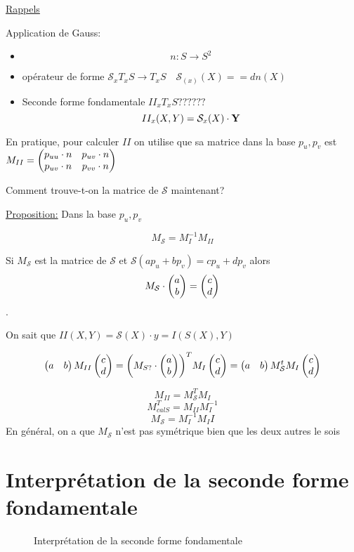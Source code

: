 



\underline{Rappels} 

Application de Gauss: 

\begin{itemize}
	\item $$n: S \to S^2$$ 
	\item opérateur de forme $\mathcal{S}_x T_{x} S \to T_{x} S\quad \mathcal{S}_(x)(X) = =dn(X)$ 
	\item Seconde forme fondamentale $II_{x} T_{x} S??????$ $$II_{x} (X,Y) = \mathcal{S}_x(X)\cdot \vb{Y}$$ 
\end{itemize}

En pratique, pour calculer $II$ on utilise que sa matrice dans la base $p_{u},p_{v} $ est $M_{II} = \begin{pmatrix} p_{uu} \cdot n & p_{uv} \cdot n \\ p_{uv} \cdot n & p_{vv} \cdot n \end{pmatrix}$ 

Comment trouve-t-on la matrice de $\mathcal{S} $ maintenant?

\underline{Proposition:} Dans la base $p_{u},p_v$  

$$M_{\mathcal{S}} = M_{I}^{-1} M_{II} $$ 

Si $M_{\mathcal{S}}$ est la matrice de $\mathcal{S} $ et $\mathcal{S}(ap_{u} + bp_{v}) = cp_{u} + dp_{v}$ alors $$M_{\mathcal{S} } \cdot \begin{pmatrix} a\\b \end{pmatrix} = \begin{pmatrix} c\\d \end{pmatrix}$$.



On sait que $II(X,Y) = \mathcal{S}(X) \cdot y = I(S(X), Y)$ 

$$\begin{pmatrix} a&b \end{pmatrix} M_{II} \begin{pmatrix} c\\d \end{pmatrix} = \qty(M_{S?} \cdot \begin{pmatrix} a\\b \end{pmatrix})^T M_{I} \begin{pmatrix} c\\d \end{pmatrix} = \begin{pmatrix} a&b \end{pmatrix} M_{\mathcal{S} }^tM_{I} \begin{pmatrix} c\\d \end{pmatrix}$$ 

$$M_{II} = M_{\mathcal{S} }^T M_{I}  $$ 
$$M_{cal S}^T=M_{II} M_{I}^{-1} $$ 
$$M_{\mathcal{S} } = M_{I}^{-1} M_II $$ 
En général, on a que $M_{\mathcal{S} } $ n'est pas symétrique bien que les deux autres le sois 


\section*{Interprétation de la seconde forme fondamentale}


\begin{figure}[ht]
    \centering
    \caption{Interprétation de la seconde forme fondamentale}
    \label{fig:interprétation-de-la-seconde-forme-fondamentale}
\end{figure}

